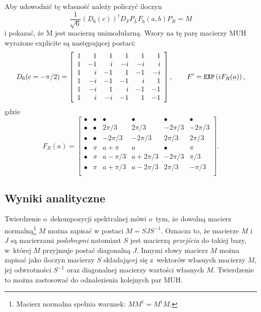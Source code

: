 \documentclass[a4paper,12pt,twoside]{article}
\begin{document}
Aby udowodni\'{c} t\k{e} w{\l}asno\'{s}\'{c} nale\.{z}y policzy\'{c} iloczyn
\begin{equation}
\frac{1}{\sqrt{6}} \left(D_6(c)\right)^{\dagger} D_F P_L F_6(a, b) P_R = M
\end{equation}
i pokaza\'{c}, \.{z}e M jest macierz\k{a} unimodularn\k{a}. Wzory na t\k{e} par\k{e} macierzy MUH wyra\.{z}one explicite s\k{a} nast\k{e}puj\k{a}cej postaci:
\begin{equation}
D_6(c=-\pi/2) =
\left[
\begin{array}{rrrrrr}
1 &    1 &    1 &    1 &    1 &    1\\
1 &   -1 &    i & -  i & -  i &    i\\
1 &    i &   -1 &    1 &   -1 & -  i\\
1 & -  i &   -1 &   -1 &    i &    1\\
1 & -  i &    1 &    i &   -1 &   -1\\
1 &    i &  - i &   -1 &    1 &   -1\\
\end{array}
\right],\qquad
F' = \verb"EXP"\left(i F_R(a) \right),
\end{equation}
gdzie
\begin{equation}
F_R(a)=\left[
\begin{array}{rrrrrr}
\bullet &    \bullet &    \bullet &     \bullet &   \bullet &  \bullet\\
\bullet &    \bullet &     2\pi/3 &      2\pi/3 &   -2\pi/3 &  -2\pi/3\\
\bullet &    \bullet &    -2\pi/3 &     -2\pi/3 &    2\pi/3 &   2\pi/3\\
\bullet &        \pi &      a+\pi &           a &   \bullet &      \pi\\
\bullet &        \pi &    a-\pi/3 &    a+2\pi/3 &   -2\pi/3 &    \pi/3\\
\bullet &        \pi &    a+\pi/3 &    a-2\pi/3 &    2\pi/3 &   -\pi/3\\
\end{array}
\right].
\end{equation}


\subsection*{Wyniki analityczne}

Twierdzenie o~dekompozycji spektralnej m\'{o}wi o~tym, \.{z}e dowoln\k{a} macierz normaln\k{a}\footnote{Macierz normalna spe{\l}nia warunek: $MM^{\dagger} = M^{\dagger}M$.} $M$ mo\.{z}na zapisa\'{c} w postaci $M=S J S^{-1}$. Oznacza to, \.{z}e macierze $M$ i $J$ s\k{a} macierzami \emph{podobnymi} natomiast $S$ jest macierz\k{a} \emph{przej\'{s}cia} do takiej bazy, w~kt\'{o}rej $M$ przyjmuje posta\'{c} diagonaln\k{a} $J$. Innymi s{\l}owy macierz $M$ mo\.{z}na zapisa\'{c} jako iloczyn macierzy $S$ sk{\l}adaj\k{a}cej si\k{e} z~wektor\'{o}w w{\l}asnych macierzy $M$, jej odwrotno\'{s}ci $S^{-1}$ oraz diagonalnej macierzy warto\'{s}ci w{\l}asnych $M$. Twierdzenie to mo\.{z}na zastosowa\'{c} do odnalezienia kolejnych par MUH.
\end{document}
